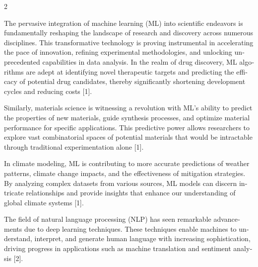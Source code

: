 \documentclass{article}
\begin{document}
\vspace{10pt}

\setlength{\columnsep}{16pt}
\setlength{\parindent}{0pt}
\setlength{\parskip}{6pt}

\begin{multicols}{2}
\enlargethispage{-118pt}

\fontsize{9.5}{12}\selectfont\color{color_29791}

\par
\vspace*{2pt}
\begin{otherlanguage}{english}
\noindent The pervasive integration of machine learning (ML) into scientific endeavors is fundamentally reshaping the landscape of research and discovery across numerous disciplines. This transformative technology is proving instrumental in accelerating the pace of innovation, refining experimental methodologies, and unlocking unprecedented capabilities in data analysis. In the realm of drug discovery, ML algorithms are adept at identifying novel therapeutic targets and predicting the efficacy of potential drug candidates, thereby significantly shortening development cycles and reducing costs [1].

Similarly, materials science is witnessing a revolution with ML's ability to predict the properties of new materials, guide synthesis processes, and optimize material performance for specific applications. This predictive power allows researchers to explore vast combinatorial spaces of potential materials that would be intractable through traditional experimentation alone [1].

In climate modeling, ML is contributing to more accurate predictions of weather patterns, climate change impacts, and the effectiveness of mitigation strategies. By analyzing complex datasets from various sources, ML models can discern intricate relationships and provide insights that enhance our understanding of global climate systems [1].

The field of natural language processing (NLP) has seen remarkable advancements due to deep learning techniques. These techniques enable machines to understand, interpret, and generate human language with increasing sophistication, driving progress in applications such as machine translation and sentiment analysis [2].


\end{otherlanguage}
\end{multicols}
\end{document}
